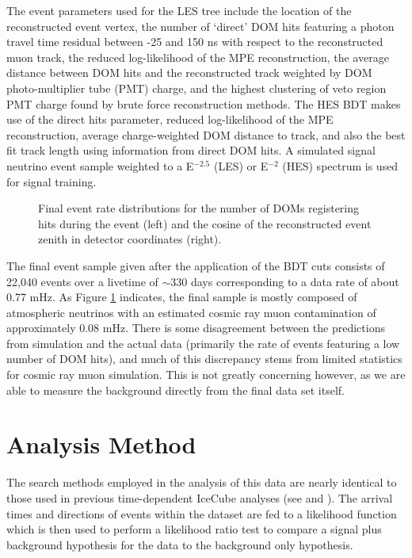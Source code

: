 \documentclass[manuscript]{aastex}
\begin{document}
The event parameters used for the LES tree include the location of the reconstructed event vertex, the number of `direct' DOM hits featuring a photon travel time residual between -25 and 150 ns with respect to the reconstructed muon track, the reduced log-likelihood of the MPE reconstruction, the average distance between DOM hits and the reconstructed track weighted by DOM photo-multiplier tube (PMT) charge, and the highest clustering of veto region PMT charge found by brute force reconstruction methods. The HES BDT makes use of the direct hits parameter, reduced log-likelihood of the MPE reconstruction, average charge-weighted DOM distance to track, and also the best fit track length using information from direct DOM hits. A simulated signal neutrino event sample weighted to a E$^{-2.5}$ (LES) or E$^{-2}$ (HES) spectrum is used for signal training.
\begin{figure}[ht]
\caption[Final Sample Event Parameter Distributions]{Final event rate distributions for the number of DOMs registering hits during the event (left) and the cosine of the reconstructed event zenith in detector coordinates (right).}
\label{fig:PostBDTDistributions}
\end{figure}

The final event sample given after the application of the BDT cuts consists of 22,040 events over a livetime of $\sim$330 days corresponding to a data rate of about 0.77 mHz. As Figure \ref{fig:PostBDTDistributions} indicates, the final sample is mostly composed of atmospheric neutrinos with an estimated cosmic ray muon contamination of approximately 0.08 mHz. There is some disagreement between the predictions from simulation and the actual data (primarily the rate of events featuring a low number of DOM hits), and much of this discrepancy stems from limited statistics for cosmic ray muon simulation. This is not greatly concerning however, as we are able to measure the background directly from the final data set itself. 


\section{Analysis Method}
The search methods employed in the analysis of this data are nearly identical to those used in previous time-dependent IceCube analyses (see \cite{2008APh....29..299B} and \cite{2015arXiv150300598A}). The arrival times and directions of events within the dataset are fed to a likelihood function which is then used to perform a likelihood ratio test to compare a signal plus background hypothesis for the data to the background only hypothesis.
\end{document}
